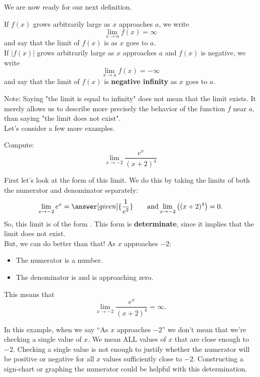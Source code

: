 \documentclass{ximera}
\begin{document}
We are now ready for our next definition.

\begin{definition}
If $f(x)$ grows arbitrarily large as $x$ approaches $a$, we write
\[
	\lim_{x\to a} f(x) = \infty
\]
and say that the limit of $f(x)$ is   as $x$
goes to $a$.\\


If $|f(x)|$ grows arbitrarily large as $x$ approaches $a$ and $f(x)$ is
negative, we write
\[
	\lim_{x\to a} f(x) = -\infty
\]
and say that the limit of $f(x)$ is  \textbf{ negative infinity}
as $x$ goes to $a$.
\end{definition}

Note: Saying "the limit is equal to infinity"  does not mean that the limit exists.  
It merely allows us to describe more precisely the behavior of the function $f$ near $a$, than saying "the limit does not exist".\\


Let's consider a few more examples.

\begin{example}
  Compute:
  \[
  \lim_{x\to -2} \frac{e^x}{(x+2)^4}
  \]
  \begin{explanation}
    First let's look at the form of this limit. We do this by taking the limits of both the numerator and denominator separately:
    \[
    \lim_{x\to -2} e^x = \answer[given]{\frac{1}{e^2}}\qquad\text{and}\lim_{x\to-2}\left((x+2)^4\right) = 0.
    \]
    So, this limit is of the form \numOverZero. This form is \textbf{determinate}, since it implies that  the limit does not exist.\\
    But, we can do better than that!
     As $x$ approaches $-2$:
    \begin{itemize}
    \item The numerator is a  number. 
    \item The denominator is  and is approaching zero.
    \end{itemize}
    This means that 
    \[
    \lim_{x\to -2} \frac{e^x}{(x+2)^4} = \infty.
    \]
  
  \end{explanation}
\end{example}
In this example, when we say ``As $x$ approaches $-2$'' we don't mean that we're checking a single value of $x$. We mean ALL values of $x$ that are close enough to $-2$. Checking a single value is not enough to justify whether the numerator will be positive or negative for all $x$ values sufficiently close to $-2$. Constructing a sign-chart or graphing the numerator could be helpful with this determination.
\end{document}
